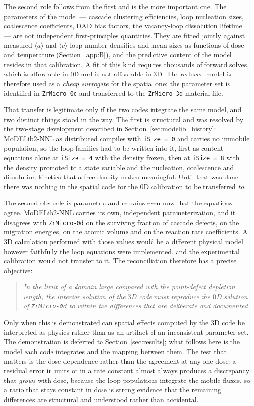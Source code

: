 \documentclass{article}
\newcommand{\aloop}{\ensuremath{\langle a\rangle}}
\newcommand{\cloop}{\ensuremath{\langle c\rangle}}
\newcommand{\ZrM}{\texttt{ZrMicro-3d}}
\newcommand{\MoD}{\textsf{MoDELib2-NNL}}
\newcommand{\ZrOd}{\texttt{ZrMicro-0d}}
\begin{document}
The second role follows from the first and is the more important one. The
parameters of the model --- cascade clustering efficiencies, loop nucleation
sizes, coalescence coefficients, DAD bias factors, the vacancy-loop dissolution
lifetime --- are not independent first-principles quantities. They are fitted
jointly against measured \aloop{} and \cloop{} loop number densities and mean
sizes as functions of dose and temperature (Section~\ref{app:B}), and the
predictive content of the model resides in that calibration. A fit of this kind
requires thousands of forward solves, which is affordable in $0$D and is not
affordable in $3$D. The reduced model is therefore used as a \emph{cheap
surrogate} for the spatial one: the parameter set is identified in {\ZrOd} and
transferred to the {\ZrM} material file.

That transfer is legitimate only if the two codes integrate the same model, and
two distinct things stood in the way. The first is structural and was resolved by
the two-stage development described in Section~\ref{sec:modelib_history}: {\MoD} as
distributed compiles with \texttt{iSize = 0} and carries no immobile population,
so the loop families had to be written into it, first as content equations alone
at \texttt{iSize = 4} with the density frozen, then at \texttt{iSize = 8} with the
density promoted to a state variable and the nucleation, coalescence and
dissolution kinetics that a free density makes meaningful. Until that was done
there was nothing in the spatial code for the $0$D calibration to be transferred
\emph{to}.

The second obstacle is parametric and remains even now that the equations agree.
{\MoD} carries its own, independent parameterization, and it disagrees with
{\ZrOd} on the surviving fraction of cascade defects, on the migration energies,
on the atomic volume and on the reaction rate coefficients. A $3$D calculation
performed with those values would be a different physical model however faithfully
the loop equations were implemented, and the experimental calibration would not
transfer to it. The reconciliation therefore has a precise objective:

\begin{quote}
\emph{In the limit of a domain large compared with the point-defect depletion
length, the interior solution of the $3$D code must reproduce the $0$D solution of
{\ZrOd} to within the differences that are deliberate and documented.}
\end{quote}

\noindent Only when this is demonstrated can spatial effects computed by the $3$D
code be interpreted as physics rather than as an artifact of an inconsistent
parameter set. The demonstration is deferred to Section~\ref{sec:results};
what follows here is the model each code integrates and the mapping between them.
The test that matters is the dose dependence rather than the agreement at any one
dose: a residual error in units or in a rate constant almost always produces a
discrepancy that \emph{grows} with dose, because the loop populations integrate the
mobile fluxes, so a ratio that stays constant in dose is strong evidence that the
remaining differences are structural and understood rather than accidental.
\end{document}

